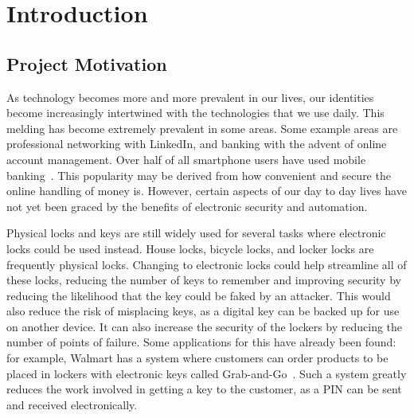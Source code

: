 \documentclass[12pt]{report}
\let\Oldsection\section
\renewcommand{\section}{\FloatBarrier\Oldsection}
\begin{document}
\chapter{Introduction} \label{introduction}


\section{Project Motivation} \label{project-motivation}

As technology becomes more and more prevalent in our lives, our identities become increasingly intertwined with the
technologies that we use daily. This melding has become extremely prevalent in some areas. Some example areas are
professional networking with LinkedIn, and banking with the advent of online account management. Over half of all
smartphone users have used mobile banking~\autocite{MOBILEBANKING}. This popularity may be derived
from how convenient and secure the online handling of money is. However, certain aspects of our day to day lives
have not yet been graced by the benefits of electronic security and automation.

Physical locks and keys are still widely used for several tasks where electronic locks could be used instead. House
locks, bicycle locks, and locker locks are frequently physical locks. Changing to electronic locks could help streamline
all of these locks, reducing the number of keys to remember and improving security by reducing the likelihood that the
key could be faked by an attacker. This would also reduce the risk of misplacing keys, as a digital key can be backed 
up for use on another device. It can also increase the security of the lockers by reducing the number of points of failure.
Some applications for this have already been found: for example, Walmart has a system 
where customers can order products to be placed in lockers with electronic keys called Grab-and-Go~\autocite{WALMART}. 
Such a system greatly reduces the work involved in getting a key to the customer, as a PIN can be sent and received 
electronically.
\end{document}
